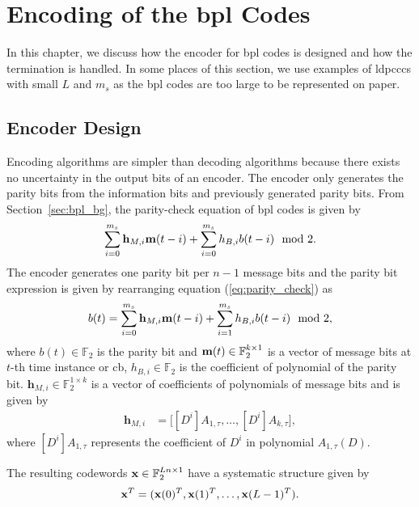 \chapter{Encoding of the \acrfull{bpl} Codes}\label{ch:encode}
In this chapter, we discuss how the encoder for \gls{bpl} codes is designed and how the termination is handled. In some places of this section, we use examples of \glspl{ldpccc} with small $L$ and $m_s$ as the \gls{bpl} codes are too large to be represented on paper.

\section{Encoder Design}\label{sec:enc_design}
Encoding algorithms are simpler than decoding algorithms because there exists no uncertainty in the output bits of an encoder. The encoder only generates the parity bits from the information bits and previously generated parity bits. From Section~\ref{sec:bpl_bg}, the parity-check equation of \gls{bpl} codes is given by
\begin{align}\label{eq:parity_check}
\sum_{i=0}^{m_s}\mathbf{h}_{M,i}\mathbf{m}(t-i)+\sum_{i=0}^{m_s}h_{B,i}b(t-i) \mod 2.
\end{align}
The encoder generates one parity bit per $n-1$ message bits and the parity bit expression is given by rearranging equation (\ref{eq:parity_check}) as
\begin{align}\label{eq:parity_bit}
b(t)=\sum_{i=0}^{m_s}\mathbf{h}_{M,i}\mathbf{m}(t-i)+\sum_{i=1}^{m_s}h_{B,i}b(t-i) \mod 2,
\end{align}
where $b(t)\in\mathbb{F}_2$ is the parity bit and $\mathbf{m}(t)\in\mathbb{F}_2^{k\times 1}$ is a vector of message bits at $t$-th time instance or \gls{cb}, $h_{B,i}\in\mathbb{F}_2$ is the coefficient of polynomial of the parity bit. $\mathbf{h}_{M,i}\in\mathbb{F}_2^{1\times k}$ is a vector of coefficients of polynomials of message bits and is given by
\begin{align}
\mathbf{h}_{M,i}&= \big[[D^i]A_{1,\tau},\dots,[D^i]A_{k,\tau}\big],
\end{align}
where $[D^i]A_{1,\tau}$ represents the coefficient of $D^i$ in polynomial $A_{1,\tau}(D)$.

The resulting codewords $\mathbf{x}\in\mathbb{F}_2^{Ln\times 1}$ have a systematic structure given by \begin{align}\mathbf{x}^T=(\mathbf{x}(0)^T,\mathbf{x}(1)^T,\dots,\mathbf{x}(L-1)^T).\end{align}

